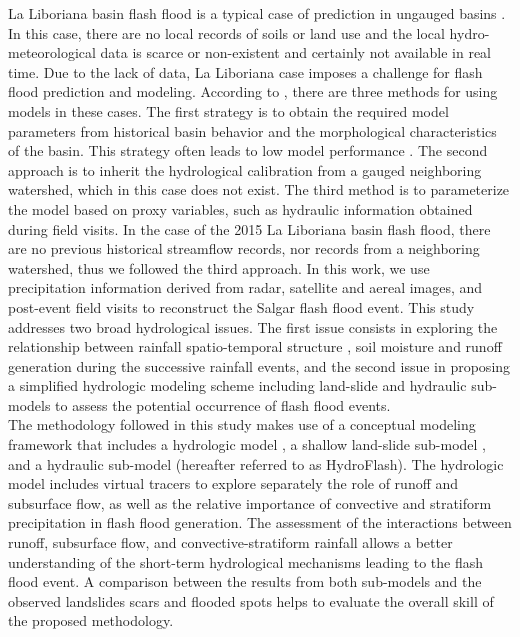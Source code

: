 \documentclass[hess, manuscript]{copernicus}
\begin{document}
La Liboriana basin flash flood is a typical case of prediction in ungauged basins  \citep{Sivapalan2013, Seibert2009, Beven2007, Bonell2006, Yamanaka2017}.  In this case,  there are no local records of soils or land use and the local hydro-meteorological data is scarce or non-existent and certainly not available in real time. Due to the lack of data, La Liboriana case imposes a challenge for flash flood prediction and modeling. According to \citet{blschl2012}, there are three methods for using models in these cases. The first strategy is to obtain the required model parameters from historical basin behavior and the morphological characteristics of the basin. This strategy often leads to low model performance \citep{Duan2006}. The second approach is to inherit the hydrological calibration from a gauged neighboring watershed, which in this case does not exist. The third method is to parameterize the model based on proxy variables, such as hydraulic information obtained during field visits. In the case of the 2015 La Liboriana basin flash flood, there are no previous historical streamflow records, nor records from a neighboring watershed, thus we followed the third approach. In this work, we use precipitation information derived from radar, satellite and aereal images, and post-event field visits to reconstruct the Salgar flash flood event. This study addresses two broad hydrological issues. The first issue consists in exploring the relationship between rainfall spatio-temporal structure \citep{Llasat2016,Fragoso2012}, soil moisture and runoff generation \citep{Penna2011,Tramblay2012b,Garambois2013} during the successive rainfall events, and the second issue in proposing a simplified hydrologic modeling scheme including land-slide and hydraulic sub-models to assess the potential occurrence of flash flood events.\\

The methodology followed in this study makes use of a conceptual modeling framework that includes a hydrologic model \citep{Velez2001, Frances2007b}, a shallow land-slide sub-model \citep{Aristizabal2016}, and a hydraulic sub-model (hereafter referred to as HydroFlash). The hydrologic model includes virtual tracers to explore separately the role of runoff and subsurface flow, as well as the relative importance of convective and stratiform precipitation in flash flood generation. The assessment of the interactions between runoff, subsurface flow, and convective-stratiform rainfall allows a better understanding of the short-term hydrological mechanisms leading to the flash flood event.  A comparison between the results from both sub-models and the observed landslides scars and flooded spots helps to evaluate the overall skill of the proposed methodology. \\
\end{document}
